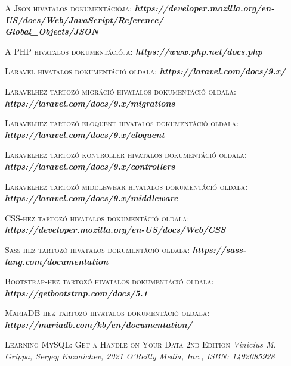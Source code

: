 \documentclass[
]{thesis-ekf}
\theoremstyle{definition}
\theoremstyle{remark}
\begin{document}
\begin{thebibliography}{2}
\textsc{A Json hivatalos dokumentációja:}
\newline
\emph{\bf{https://developer.mozilla.org/en-US/docs/Web/JavaScript/Reference/\\Global\_Objects/JSON}}

\textsc{A PHP hivatalos dokumentációja:}
\newline
\emph{\bf{https://www.php.net/docs.php}}

\textsc{Laravel hivatalos dokumentáció oldala:}
\newline
\emph{\bf{https://laravel.com/docs/9.x/}}

\textsc{Laravelhez tartozó migráció hivatalos dokumentáció oldala:}
\newline
\emph{\bf{https://laravel.com/docs/9.x/migrations}}

\textsc{Laravelhez tartozó eloquent hivatalos dokumentáció oldala:}
\newline
\emph{\bf{https://laravel.com/docs/9.x/eloquent}}

\textsc{Laravelhez tartozó kontroller hivatalos dokumentáció oldala:}
\newline
\emph{\bf{https://laravel.com/docs/9.x/controllers}}

\textsc{Laravelhez tartozó middlewear hivatalos dokumentáció oldala:}
\newline
\emph{\bf{https://laravel.com/docs/9.x/middleware}}

\textsc{CSS-hez tartozó hivatalos dokumentáció oldala:}
\newline
\emph{\bf{https://developer.mozilla.org/en-US/docs/Web/CSS}}

\textsc{Sass-hez tartozó hivatalos dokumentáció oldala:}
\newline
\emph{\bf{https://sass-lang.com/documentation}}

\textsc{Bootstrap-hez tartozó hivatalos dokumentáció oldala:}
\newline
\emph{\bf{https://getbootstrap.com/docs/5.1}}

\textsc{MariaDB-hez tartozó hivatalos dokumentáció oldala:}
\newline
\emph{\bf{https://mariadb.com/kb/en/documentation/}}

\textsc{Learning MySQL: Get a Handle on Your Data 2nd Edition}
\newline
\emph{Vinicius M. Grippa, Sergey Kuzmichev,  2021}
\emph{O'Reilly Media, Inc., ISBN: 1492085928}


\end{thebibliography}
\end{document}
